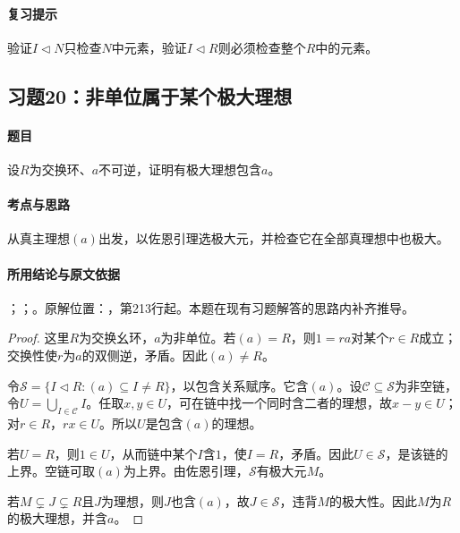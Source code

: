 \paragraph{复习提示}

验证$I\lhd N$只检查$N$中元素，验证$I\lhd R$则必须检查整个$R$中的元素。



\subsection{习题20：非单位属于某个极大理想}

\label{ex:3:20}

\paragraph{题目}

设$R$为交换环、$a$不可逆，证明有极大理想包含$a$。

\paragraph{考点与思路}

从真主理想$(a)$出发，以佐恩引理选极大元，并检查它在全部真理想中也极大。

\paragraph{所用结论与原文依据}

；；。原解位置：，第213行起。本题在现有习题解答的思路内补齐推导。


\begin{proof}

这里$R$为交换幺环，$a$为非单位。若$(a)=R$，则$1=ra$对某个$r\in R$成立；交换性使$r$为$a$的双侧逆，矛盾。因此$(a)\ne R$。

令$\mathcal S=\{I\lhd R:(a)\subseteq I\ne R\}$，以包含关系赋序。它含$(a)$。设$\mathcal C\subseteq\mathcal S$为非空链，令$U=\bigcup_{I\in\mathcal C}I$。任取$x,y\in U$，可在链中找一个同时含二者的理想，故$x-y\in U$；对$r\in R$，$rx\in U$。所以$U$是包含$(a)$的理想。

若$U=R$，则$1\in U$，从而链中某个$I$含$1$，使$I=R$，矛盾。因此$U\in\mathcal S$，是该链的上界。空链可取$(a)$为上界。由佐恩引理，$\mathcal S$有极大元$M$。

若$M\subsetneq J\subsetneq R$且$J$为理想，则$J$也含$(a)$，故$J\in\mathcal S$，违背$M$的极大性。因此$M$为$R$的极大理想，并含$a$。

\end{proof}

